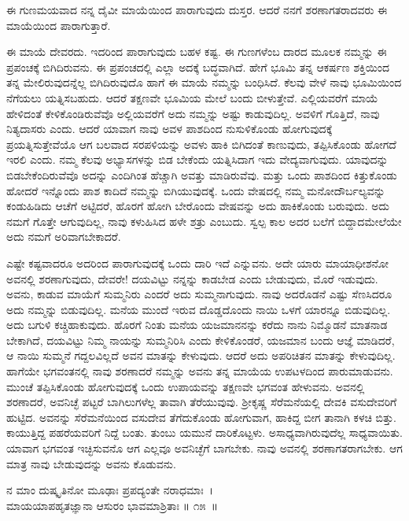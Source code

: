 \begin{artha}
ಈ ಗುಣಮಯವಾದ ನನ್ನ ದೈವೀ ಮಾಯೆಯಿಂದ ಪಾರಾಗುವುದು ದುಸ್ತರ. ಆದರೆ ನನಗೆ ಶರಣಾಗತರಾದವರು ಈ ಮಾಯೆಯಿಂದ ಪಾರಾಗುತ್ತಾರೆ.
\end{artha}

ಈ ಮಾಯೆ ದೇವರದು. ಇದರಿಂದ ಪಾರಾಗುವುದು ಬಹಳ ಕಷ್ಟ. ಈ ಗುಣಗಳೆಂಬ ದಾರದ ಮೂಲಕ ನಮ್ಮನ್ನು ಈ ಪ್ರಪಂಚಕ್ಕೆ ಬಿಗಿದಿರುವನು. ಈ ಪ್ರಪಂಚದಲ್ಲಿ ಎಲ್ಲಾ ಅದಕ್ಕೆ ಬದ್ಧವಾಗಿದೆ. ಹೇಗೆ ಭೂಮಿ ತನ್ನ ಆಕರ್ಷಣ ಶಕ್ತಿಯಿಂದ ತನ್ನ ಮೇಲಿರುವುದನ್ನೆಲ್ಲ ಬಿಗಿದಿರುವುದೊ ಹಾಗೆ ಈ ಮಾಯೆ ನಮ್ಮನ್ನು ಬಂಧಿಸಿದೆ. ಕೆಲವು ವೇಳೆ ನಾವು ಭೂಮಿಯಿಂದ ನೆಗೆಯಲು ಯತ್ನಿಸಬಹುದು. ಆದರೆ ತಕ್ಷಣವೇ ಭೂಮಿಯ ಮೇಲೆ ಬಂದು ಬೀಳುತ್ತೇವೆ. ಎಲ್ಲಿಯವರೆಗೆ ಮಾಯೆ ಹೇಳಿದಂತೆ ಕೇಳಿಕೊಂಡಿರುವೆವೊ ಅಲ್ಲಿಯವರೆಗೆ ಅದು ನಮ್ಮನ್ನು ಅಷ್ಟು ಕಾಡುವುದಿಲ್ಲ. ಅವಳಿಗೆ ಗೊತ್ತಿದೆ, ನಾವು ನಿತ್ಯದಾಸರು ಎಂದು. ಆದರೆ ಯಾವಾಗ ನಾವು ಅವಳ ಪಾಶದಿಂದ ನುಸುಳಿಕೊಂಡು ಹೋಗುವುದಕ್ಕೆ ಪ್ರಯತ್ನಿಸುತ್ತೇವೆಯೊ ಆಗ ಬಲವಾದ ಸರಪಳಿಯನ್ನು ಅವಳು ಹಾಕಿ ಬಿಗಿದಂತೆ ಕಾಣುವುದು, ತಪ್ಪಿಸಿಕೊಂಡು ಹೋಗದೆ ಇರಲಿ ಎಂದು. ನಮ್ಮ ಕೆಲವು ಅಭ್ಯಾಸಗಳನ್ನು ಬಿಡ ಬೇಕೆಂದು ಯತ್ನಿಸಿದಾಗ ಇದು ವೇದ್ಯವಾಗುವುದು. ಯಾವುದನ್ನು ಬಿಡಬೇಕೆಂದಿರುವೆವೊ ಅದನ್ನು ಎಂದಿಗಿಂತ ಹೆಚ್ಚಾಗಿ ಅವತ್ತು ಮಾಡಿರುವೆವು. ಮತ್ತು ಒಂದು ಪಾಶದಿಂದ ಕಿತ್ತುಕೊಂಡು ಹೋದರೆ ಇನ್ನೊಂದು ಪಾಶ ಕಾದಿದೆ ನಮ್ಮನ್ನು ಬಿಗಿಯುವುದಕ್ಕೆ. ಒಂದು ವೇಷದಲ್ಲಿ ನಮ್ಮ ಮನೋದೌರ್ಬಲ್ಯವನ್ನು ಕಂಡುಹಿಡಿದು ಆಚೆಗೆ ಅಟ್ಟಿದರೆ, ಹೊರಗೆ ಹೋಗಿ ಬೇರೊಂದು ವೇಷವನ್ನು ಅದು ಹಾಕಿಕೊಂಡು ಬರುವುದು. ಅದು ನಮಗೆ ಗೊತ್ತೇ ಆಗುವುದಿಲ್ಲ, ನಾವು ಕಳುಹಿಸಿದ ಹಳೇ ಶತ್ರು ಎಂಬುದು. ಸ್ವಲ್ಪ ಕಾಲ ಅದರ ಬಲೆಗೆ ಬಿದ್ದಾದಮೇಲೆಯೇ ಅದು ನಮಗೆ ಅರಿವಾಗಬೇಕಾದರೆ.

ಎಷ್ಟೇ ಕಷ್ಟವಾದರೂ ಅದರಿಂದ ಪಾರಾಗುವುದಕ್ಕೆ ಒಂದು ದಾರಿ ಇದೆ ಎನ್ನುವನು. ಅದೇ ಯಾರು ಮಾಯಾಧೀಶನೋ ಅವನಲ್ಲಿ ಶರಣಾಗುವುದು, ದೇವರೇ! ದಯವಿಟ್ಟು ನನ್ನನ್ನು ಕಾಡಬೇಡ ಎಂದು ಬೇಡುವುದು, ಮೊರೆ ಇಡುವುದು. ಅವನು, ಕಾಡುವ ಮಾಯೆಗೆ ಸುಮ್ಮನಿರು ಎಂದರೆ ಅದು ಸುಮ್ಮನಾಗುವುದು. ನಾವು ಅದರೊಡನೆ ಎಷ್ಟು ಸೆಣಸಿದರೂ ಅದು ನಮ್ಮನ್ನು ಬಿಡುವುದಿಲ್ಲ. ಮನೆಯ ಮುಂದೆ ಇರುವ ದೊಡ್ಡದೊಂದು ನಾಯಿ ಒಳಗೆ ಯಾರನ್ನೂ ಬಿಡುವುದಿಲ್ಲ. ಅದು ಬಗುಳಿ ಕಚ್ಚಿಹಾಕುವುದು. ಹೊರಗೆ ನಿಂತು ಮನೆಯ ಯಜಮಾನನನ್ನು ಕರೆದು ನಾನು ನಿಮ್ಮೊಡನೆ ಮಾತನಾಡ ಬೇಕಾಗಿದೆ, ದಯವಿಟ್ಟು ನಿಮ್ಮ ನಾಯನ್ನು ಸುಮ್ಮನಿರಿಸಿ ಎಂದು ಕೇಳಿಕೊಂಡರೆ, ಯಜಮಾನ ಬಂದು ಆಜ್ಞೆ ಮಾಡಿದರೆ, ಆ ನಾಯಿ ಸುಮ್ಮನೆ ಗದ್ದಲವಿಲ್ಲದೆ ಅವನ ಮಾತನ್ನು ಕೇಳುವುದು. ಆದರೆ ಅದು ಅಪರಿಚಿತನ ಮಾತನ್ನು ಕೇಳುವುದಿಲ್ಲ. ಹಾಗೆಯೇ ಭಗವಂತನಲ್ಲಿ ನಾವು ಶರಣಾದರೆ ನಮ್ಮನ್ನು ಅವನು ತನ್ನ ಮಾಯೆಯ ಉಪಟಳದಿಂದ ಪಾರುಮಾಡುವನು. ಮುಂಚೆ ತಪ್ಪಿಸಿಕೊಂಡು ಹೋಗುವುದಕ್ಕೆ ಒಂದು ಉಪಾಯವನ್ನು ತಕ್ಷಣವೇ ಭಗವಂತ ಹೇಳುವನು. ಅವನಲ್ಲಿ ಶರಣಾದರೆ, ಅವನಿಚ್ಛೆ ಪಟ್ಟರೆ ಬಾಗಿಲುಗಳೆಲ್ಲ ತಾವಾಗಿ ತೆರೆಯುವುವು. ಶ‍್ರೀಕೃಷ್ಣ ಸೆರೆಮನೆಯಲ್ಲಿ ದೇವಕಿ ವಸುದೇವರಿಗೆ ಹುಟ್ಟಿದ. ಅವನನ್ನು ಸೆರೆಮನೆಯಿಂದ ವಸುದೇವ ತೆಗೆದುಕೊಂಡು ಹೋಗುವಾಗ, ಹಾಕಿದ್ದ ಬೀಗ ತಾನಾಗಿ ಕಳಚಿ ಬಿತ್ತು. ಕಾಯುತ್ತಿದ್ದ ಪಹರೆಯವರಿಗೆ ನಿದ್ದೆ ಬಂತು. ತುಂಬು ಯಮುನೆ ದಾರಿಕೊಟ್ಟಳು. ಅಸಾಧ್ಯವಾಗಿರುವುದೆಲ್ಲ ಸಾಧ್ಯವಾಯಿತು. ಯಾವಾಗ ಭಗವಂತ ಇಚ್ಛಿಸುವನೊ ಆಗ ಎಲ್ಲವೂ ಅವನಿಚ್ಛೆಗೆ ಬಾಗಬೇಕು. ನಾವು ಅವನಲ್ಲಿ ಶರಣಾಗತರಾಗಬೇಕು. ಆಗ ಮಾತ್ರ ನಾವು ಬೇಡುವುದನ್ನು ಅವನು ಕೊಡುವನು.

\begin{shloka}
ನ ಮಾಂ ದುಷ್ಕೃತಿನೋ ಮೂಢಾಃ ಪ್ರಪದ್ಯಂತೇ ನರಾಧಮಾಃ~।\\ಮಾಯಯಾಪಹೃತಜ್ಞಾನಾ ಆಸುರಂ ಭಾವಮಾಶ್ರಿತಾಃ \hfill॥ ೧೫~॥
\end{shloka}

